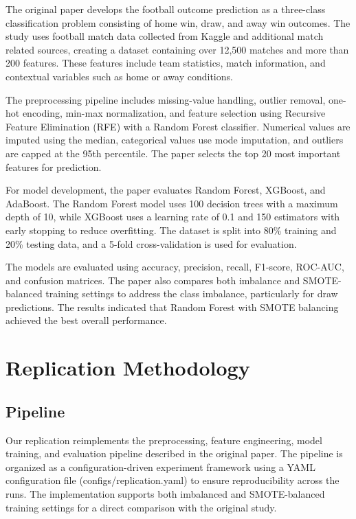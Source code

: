 \documentclass[11pt]{article}
\begin{document}
The original paper develops the football outcome prediction as a three-class classification problem consisting of home win, draw, and away win outcomes. The study uses football match data collected from Kaggle and additional match related sources, creating a dataset containing over 12,500 matches and more than 200 features. These features include team statistics, match information, and contextual variables such as home or away conditions.

The preprocessing pipeline includes missing-value handling, outlier removal, one-hot encoding, min-max normalization, and feature selection using Recursive Feature Elimination (RFE) with a Random Forest classifier. Numerical values are imputed using the median, categorical values use mode imputation, and outliers are capped at the 95th percentile. The paper selects the top 20 most important features for prediction.

For model development, the paper evaluates Random Forest, XGBoost, and AdaBoost. The Random Forest model uses 100 decision trees with a maximum depth of 10, while XGBoost uses a learning rate of 0.1 and 150 estimators with early stopping to reduce overfitting. The dataset is split into 80\% training and 20\% testing data, and a 5-fold cross-validation is used for evaluation.

The models are evaluated using accuracy, precision, recall, F1-score, ROC-AUC, and confusion matrices. The paper also compares both imbalance and SMOTE-balanced training settings to address the class imbalance, particularly for draw predictions. The results indicated that Random Forest with SMOTE balancing achieved the best overall performance.

\section{Replication Methodology}

\subsection{Pipeline}

Our replication reimplements the preprocessing, feature engineering, model training, and evaluation pipeline described in the original paper. The pipeline is organized as a configuration-driven experiment framework using a YAML configuration file (configs/replication.yaml) to ensure reproducibility across the runs. The implementation supports both imbalanced and SMOTE-balanced training settings for a direct comparison with the original study.
\end{document}
